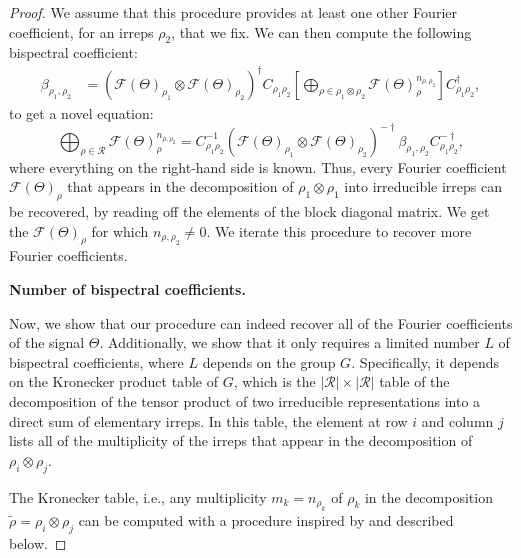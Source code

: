 \begin{proof}
    We assume that this procedure provides at least one other Fourier coefficient, for an irreps $\rho_2$, that we fix. We can then compute the following bispectral coefficient:
    \begin{align*}
    \beta_{\rho_1, \rho_2}
    &=
    (\mathcal{F}(\Theta)_{\rho_1} \otimes \mathcal{F}(\Theta)_{\rho_2})^\dagger C_{{\rho_1} {\rho_2}}
    \left[
    \bigoplus_{\rho \in \rho_1 \otimes \rho_2}
        \mathcal{F}(\Theta)_\rho^{n_{\rho, \rho_2}}
    \right] C_{{\rho_1} {\rho_2}}^{\dagger},
    \end{align*}
    to get a novel equation:
        \begin{equation}
        \bigoplus_{\rho \in \mathcal{R}}
        \mathcal{F}(\Theta)_\rho^{n_{\rho, \rho_2}}
    = C_{{\rho_1} {\rho_2}}^{-1}(\mathcal{F}(\Theta)_{\rho_1} \otimes \mathcal{F}(\Theta)_{\rho_2})^{-\dagger} \beta_{\rho_1, \rho_2} C_{{\rho_1} {\rho_2}}^{-\dagger},
    \end{equation}
    where everything on the right-hand side is known. Thus, every Fourier coefficient $\mathcal{F}(\Theta)_\rho$ that appears in the decomposition of $\rho_1 \otimes \rho_1$ into irreducible irreps can be recovered, by reading off the elements of the block diagonal matrix. We get the $\mathcal{F}(\Theta)_\rho$ for which $n_{\rho, \rho_2} \neq 0$. We iterate this procedure to recover more Fourier coefficients.

    \textbf{Number of bispectral coefficients.}

    Now, we show that our procedure can indeed recover all of the Fourier coefficients of the signal $\Theta$. Additionally, we show that it only requires a limited number $L$ of bispectral coefficients, where $L$ depends on the group $G$. Specifically, it depends on the Kronecker product table of $G$, which is the $|\mathcal{R}| \times |\mathcal{R}|$ table of the decomposition of the tensor product of two irreducible representations into a direct sum of elementary irreps. In this table, the element at row $i$ and column $j$ lists all of the multiplicity of the irreps that appear in the decomposition of $\rho_i \otimes \rho_j$.

    The Kronecker table, i.e., any multiplicity $m_k = n_{\rho_k}$ of $\rho_k$ in the decomposition $\tilde \rho = \rho_i \otimes \rho_j$ can be computed with a procedure inspired by \cite{cohen2016steerable} and described below.


\end{proof}
